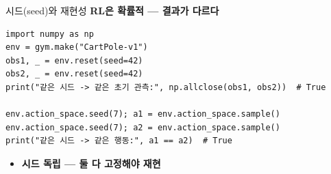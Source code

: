 \begin{frame}[fragile]{시드(seed)와 재현성}
  \textbf{RL은 확률적 — 결과가 다르다}
\begin{lstlisting}
import numpy as np
env = gym.make("CartPole-v1")
obs1, _ = env.reset(seed=42)
obs2, _ = env.reset(seed=42)
print("같은 시드 -> 같은 초기 관측:", np.allclose(obs1, obs2))  # True

env.action_space.seed(7); a1 = env.action_space.sample()
env.action_space.seed(7); a2 = env.action_space.sample()
print("같은 시드 -> 같은 행동:", a1 == a2)  # True
\end{lstlisting}
  \begin{itemize}
    
    \item \textbf{시드 독립 — 둘 다 고정해야 재현}
  \end{itemize}

\end{frame}

